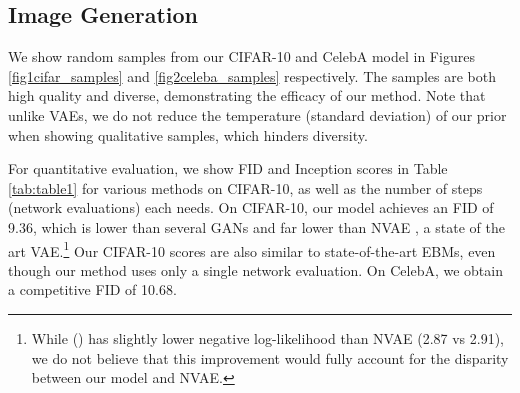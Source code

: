 \documentclass[12pt,a4paper]{article}
\newcommand{\cited}[1]{\citeauthor{#1} (\citeyear{#1})}
\newcommand{\citebracket}[1]{\cite{#1}}
\begin{document}
\subsection{Image Generation}
We show random samples from our CIFAR-10 and CelebA model in Figures \ref{fig1cifar_samples} and \ref{fig2celeba_samples} respectively. The samples are both high quality and diverse, demonstrating the efficacy of our method. Note that unlike VAEs, we do not reduce the temperature (standard deviation) of our prior when showing qualitative samples, which hinders diversity. 

For quantitative evaluation, we show FID \citebracket{heusel2018gans} and Inception scores \citebracket{salimans2016improved} in Table \ref{tab:table1} for various methods on CIFAR-10, as well as the number of steps (network evaluations) each needs. On CIFAR-10, our model achieves an FID of 9.36, which is lower than several GANs and far lower than NVAE \citebracket{nvae}, a state of the art VAE.\footnote{While \cited{vdvae} has slightly lower negative log-likelihood than NVAE (2.87 vs 2.91), we do not believe that this improvement would fully account for the disparity between our model and NVAE.} Our CIFAR-10 scores are also similar to state-of-the-art EBMs, even though our method uses only a single network evaluation. On CelebA, we obtain a competitive FID of 10.68. 
\end{document}

